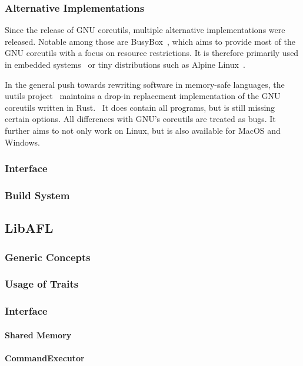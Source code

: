\documentclass{article}
\let\savedCite=\cite
\renewcommand{\cite}{\unskip~\savedCite}
\begin{document}
\begin{multicols}{2}
    \subsubsection{Alternative Implementations}

    Since the release of GNU coreutils, multiple alternative implementations were released. Notable among those are BusyBox\cite{BusyBox}, which aims to provide most of the GNU coreutils with a focus on resource restrictions. It is therefore primarily used in embedded systems\cite{BusyBox} or tiny distributions such as Alpine Linux\cite{Alpine}.

    In the general push towards rewriting software in memory-safe languages, the uutils project\cite{Uutils} maintains a drop-in replacement implementation of the GNU coreutils written in Rust.\cite{UutilsCoreUtils} It does contain all programs, but is still missing certain options. All differences with GNU's coreutils are treated as bugs. It further aims to not only work on Linux, but is also available for MacOS and Windows.

    \subsubsection{Interface}



    \subsubsection{Build System}

    \subsection{LibAFL}
    \subsubsection{Generic Concepts}
    \subsubsection{Usage of Traits}
    \subsubsection{Interface}
    \paragraph{Shared Memory}
    \paragraph{CommandExecutor}


\end{multicols}
\end{document}
